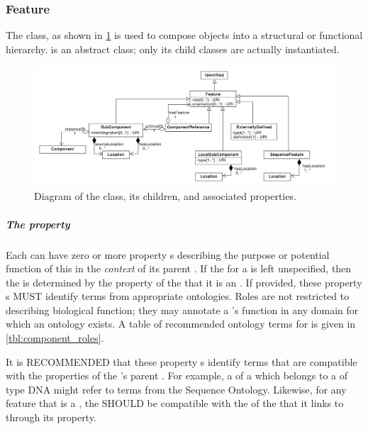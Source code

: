 \subsubsection{Feature}
\label{sec:Feature}

The  class, as shown in \ref{uml:subcomponent} is used to compose  objects into a structural or functional hierarchy. 
 is an abstract class; only its child classes are actually instantiated.

\begin{figure}[ht]
\begin{center}
\includegraphics[width=\textwidth]{uml/feature}
\caption[]{Diagram of the  class, its children, and associated properties.}
\label{uml:subcomponent}
\end{center}
\end{figure}

\subparagraph{The  property}\label{sec:role:F}

Each  can have zero or more  property s describing the purpose or potential function of this  in the \textit{context} of its parent .
If the  for a  is left unspecified, then the  is determined by the  property of the  that it is an . 
If provided, these  property s MUST identify terms from appropriate ontologies. Roles are not restricted to describing biological function; they may annotate a 's function in any domain for which an ontology exists.
A table of recommended ontology terms for  is given in \ref{tbl:component_roles}.

It is RECOMMENDED that these  property s identify terms that are compatible with the  properties of the 's parent .
For example, a  of a  which belongs to a  of type DNA might refer to terms from the Sequence Ontology. 
Likewise, for any feature that is a , the  SHOULD be compatible with the  of the  that it links to through its  property.

